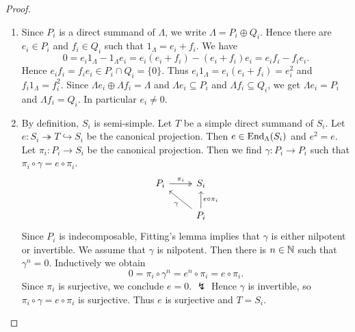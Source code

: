 \begin{proof}\
\begin{enumerate}
\item Since $P_i$ is a direct summand of $\Lambda$, we write $\Lambda=P_i\oplus Q_i$. Hence there are $e_i\in P_i$ and $f_i\in Q_i$ such that $1_\Lambda = e_i+f_i$. We have
\[
0 = e_i 1_\Lambda - 1_\Lambda e_i
  = e_i (e_i+f_i) - (e_i+f_i) e_i
  = e_i f_i - f_i e_i.
\]
Hence $e_if_i=f_ie_i \in P_i\cap Q_i =\{0\}$. Thus $e_i 1_\Lambda = e_i (e_i+f_i) = e_i^2$ and $f_i 1_\Lambda = f_i^2$. Since $\Lambda e_i \oplus \Lambda f_i =\Lambda$ and $\Lambda e_i \subseteq P_i$ and $\Lambda f_i \subseteq Q_i$, we get $\Lambda e_i = P_i$ and $\Lambda f_i = Q_i$. In particular $e_i\neq 0$.

\item By definition, $S_i$ is semi-simple. Let $T$ be a simple direct summand of $S_i$. Let $e: S_i \twoheadrightarrow T \hookrightarrow S_i$ be the canonical projection. Then $e\in\operatorname{End}_{\Lambda}(S_i)$ and $e^2=e$. Let $\pi_i:P_i\to S_i$ be the canonical projection. Then we find $\gamma:P_i\to P_i$ such that $\pi_i\circ \gamma = e\circ \pi_i$.
%
\[
\begin{tikzcd}
P_i \ar[r,"\pi_i",two heads] & S_i \\
& P_i \ar[u,"e\circ \pi_i"'] \ar[ul,"\gamma"]
\end{tikzcd}
\]
%
Since $P_i$ is indecomposable, Fitting's lemma implies that $\gamma$ is either nilpotent or invertible. We assume that $\gamma$ is nilpotent. Then there is $n\in\mathbb{N}$ such that $\gamma^n=0$. Inductively we obtain 
\[
0 = \pi_i \circ \gamma^n = e^n \circ \pi_i = e \circ \pi_i. 
\]
Since $\pi_i$ is surjective, we conclude $e=0$. $\lightning$ Hence $\gamma$ is invertible, so $\pi_i\circ \gamma = e\circ \pi_i$ is surjective. Thus $e$ is surjective and $T=S_i$.


\end{enumerate}
\end{proof}
